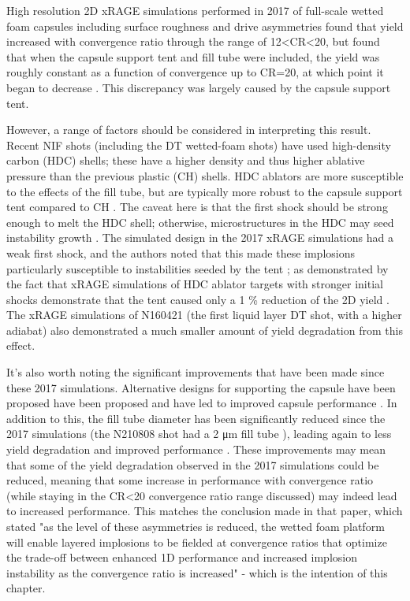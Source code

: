 High resolution 2D xRAGE simulations performed in 2017 of full-scale wetted foam capsules including surface roughness and drive asymmetries found that yield increased with convergence ratio through the range of 12<CR<20, but found that when the capsule support tent and fill tube were included, the yield was roughly constant as a function of convergence up to CR=20, at which point it began to decrease \cite{Haines2017a}. This discrepancy was largely caused by the capsule support tent.

However, a range of factors should be considered in interpreting this result. Recent NIF shots (including the DT wetted-foam shots) have used high-density carbon (HDC) shells; these have a higher density and thus higher ablative pressure than the previous plastic (CH) shells. HDC ablators are more susceptible to the effects of the fill tube, but are typically more robust to the capsule support tent compared to CH \cite{Zylstra2022, Abu-Shawareb2022, Haines2019a, Clark2018}. The caveat here is that the first shock should be strong enough to melt the HDC shell; otherwise, microstructures in the HDC may seed instability growth \cite{Mackinnon2014, Haines2019a}. The simulated design in the 2017 xRAGE simulations had a weak first shock, and the authors noted that this made these implosions particularly susceptible to instabilities seeded by the tent \cite{Haines2017a}; as demonstrated by the fact that xRAGE simulations of HDC ablator targets with stronger initial shocks demonstrate that the tent caused only a 1 \% reduction of the 2D yield \cite{Haines2019a}. The xRAGE simulations of N160421 (the first liquid layer DT shot, with a higher adiabat) also demonstrated a much smaller amount of yield degradation from this effect. 

It's also worth noting the significant improvements that have been made since these 2017 simulations. Alternative designs for supporting the capsule have been proposed have been proposed \cite{Weber2017, Hammel2018a} and have led to improved capsule performance \cite{Hammel2018a}. In addition to this, the fill tube diameter has been significantly reduced since the 2017 simulations (the N210808 shot had a 2 \unit{\micro\meter} fill tube \cite{Abu-Shawareb2022}), leading again to less yield degradation and improved performance \cite{Weber2020, Pak2020}. These improvements may mean that some of the yield degradation observed in the 2017 simulations could be reduced, meaning that some increase in performance with convergence ratio (while staying in the CR<20 convergence ratio range discussed) may indeed lead to increased performance. This matches the conclusion made in that paper, which stated "as the level of these asymmetries is reduced, the wetted foam platform will enable layered implosions to be fielded at convergence ratios that optimize the trade-off between enhanced 1D performance and increased implosion instability as the convergence ratio is increased" - which is the intention of this chapter.

